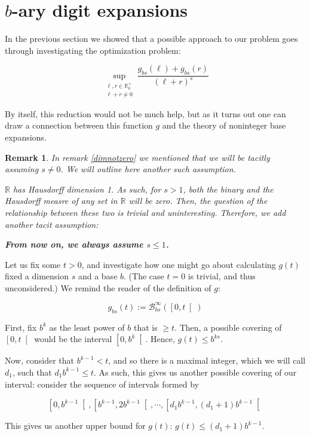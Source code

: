 \documentclass[11pt, reqno]{amsart}
\newcommand{\R}{\mathbb{R}}
\newcommand{\BB}{\mathcal{B}}
\newtheorem{remark}{Remark}
\begin{document}
\section{$b$-ary digit expansions}\label{sec6}

In the previous section we showed that a possible approach to our problem goes through investigating the optimization problem:

\[ \sup_{\substack{\ell,r \in \R^+_0\\\ell+r \neq 0}} \frac{g_{bs}(\ell) + g_{bs}(r)}{(\ell + r)^s} \]

By itself, this reduction would not be much help, but as it turns out one can draw a connection between this function $g$ and the theory of noninteger base expansions.

\begin{remark}
In remark \ref{dimnotzero} we mentioned that we will be tacitly assuming $s \neq 0$. We will outline here another such assumption.

$\R$ has Hausdorff dimension 1. As such, for $s > 1$, both the binary and the Hausdorff measre of \emph{any} set in $\R$ will be zero. Then, the question of the relationship between these two is trivial and uninteresting. Therefore, we add another tacit assumption:

\textbf{From now on, we always assume $s \leq 1$.}
\end{remark}

Let us fix some $t > 0$, and investigate how one might go about calculating $g(t)$ fixed a dimension $s$ and a base $b$. (The case $t = 0$ is trivial, and thus unconsidered.) We remind the reader of the definition of $g$:

\[g_{bs}(t) := \BB_{bs}^\infty(\left[0, t \right[)\]

First, fix $b^k$ as the least power of $b$ that is $\geq t$. Then, a possible covering of $\left[0, t \right[$ would be the interval $\left[0, b^k\right[$. Hence, $g(t) \leq b^{ks}$.

Now, consider that $b^{k-1} < t$, and so there is a maximal integer, which we will call $d_1$, such that $d_1 b^{k-1} \leq t$. As such, this gives us another possible covering of our interval: consider the sequence of intervals formed by

\[\left[0, b^{k-1} \right[, \left[b^{k-1}, 2 b^{k-1} \right[, \cdots, \left[d_1 b^{k-1}, (d_1 + 1) b^{k-1} \right[ \]

This gives us another upper bound for $g(t)$: $g(t) \leq (d_1 + 1) b^{k-1}$.
\end{document}
